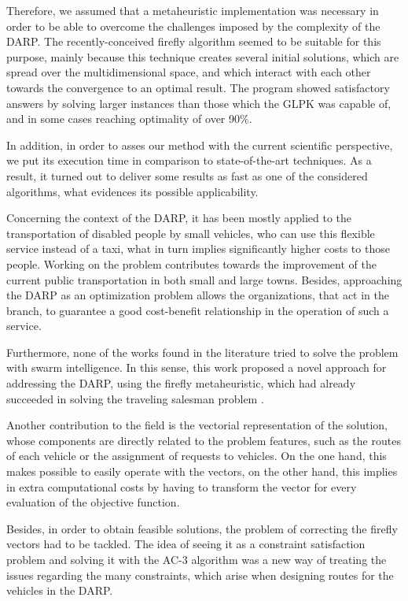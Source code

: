 \documentclass[tuberlin,cic,tc,openright,english,noabntcite,oneside]{iiufrgs}
\begin{document}
Therefore, we assumed that a metaheuristic implementation was necessary in order to be able to overcome the challenges imposed by the complexity of the DARP. The recently-conceived firefly algorithm seemed to be suitable for this purpose, mainly because this technique creates several initial solutions, which are spread over the multidimensional space, and which interact with each other towards the convergence to an optimal result. The program showed satisfactory answers by solving larger instances than those which the GLPK was capable of, and in some cases reaching optimality of over 90\%.

In addition, in order to asses our method with the current scientific perspective, we put its execution time in comparison to state-of-the-art techniques. As a result, it turned out to deliver some results as fast as one of the considered algorithms, what evidences its possible applicability.

Concerning the context of the DARP, it has been mostly applied to the transportation of disabled people by small vehicles, who can use this flexible service instead of a taxi, what in turn implies significantly higher costs to those people. Working on the problem contributes towards the improvement of the current public transportation in both small and large towns. Besides, approaching the DARP as an optimization problem allows the organizations, that act in the branch, to guarantee a good cost-benefit relationship in the operation of such a service.

Furthermore, none of the works found in the literature tried to solve the problem with swarm intelligence. In this sense, this work proposed a novel approach for addressing the DARP, using the firefly metaheuristic, which had already succeeded in solving the traveling salesman problem \parencite{jati_evolutionary_2011}.

Another contribution to the field is the vectorial representation of the solution, whose components are directly related to the problem features, such as the routes of each vehicle or the assignment of requests to vehicles. On the one hand, this makes possible to easily operate with the vectors, on the other hand, this implies in extra computational costs by having to transform the vector for every evaluation of the objective function.

Besides, in order to obtain feasible solutions, the problem of correcting the firefly vectors had to be tackled. The idea of seeing it as a constraint satisfaction problem and solving it with the AC-3 algorithm was a new way of treating the issues regarding the many constraints, which arise when designing routes for the vehicles in the DARP.
\end{document}
